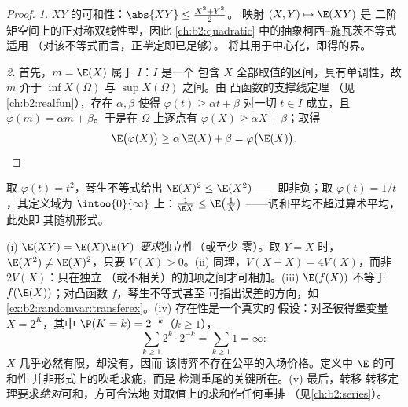 \begin{proof}
\emph{1.} $XY$ 的可和性：$\abs{XY} \leq \frac{X^2 + Y^2}2$。
映射 $(X, Y) \mapsto \E(XY)$ 是
二阶矩空间上的正对称双线性型，因此
\cref{ch:b2:quadratic} 中的抽象柯西--施瓦茨不等式适用
（对该不等式而言，正\emph{半}定即已足够）。
将其用于中心化，即得的界。

\emph{2.} 首先，$m = \E(X)$ 属于 $I$：$I$ 是一个
包含 $X$ 全部取值的区间，具有单调性，故 $m$
介于 $\inf X(\Omega)$ 与 $\sup X(\Omega)$ 之间。由
凸函数的支撑线定理
（见\cref{ch:b2:realfun}），存在 $\alpha, \beta$ 使得
$\varphi(t) \geq \alpha t + \beta$ 对一切 $t \in I$ 成立，且
$\varphi(m) = \alpha m + \beta$。于是在 $\Omega$ 上逐点有
$\varphi(X) \geq \alpha X + \beta$；取得
\[
\E\bigl(\varphi(X)\bigr) \geq \alpha\,\E(X) + \beta
= \varphi\bigl(\E(X)\bigr). \qedhere
\]
\end{proof}

\begin{example}
取 $\varphi(t) = t^2$，琴生不等式给出 $\E(X)^2 \leq \E(X^2)$——
即非负；取 $\varphi(t) = 1/t$，其定义域为
$\intoo{0}{\infty}$ 上：$\frac{1}{\E X} \leq \E\bigl(\frac1X\bigr)$
——调和平均不超过算术平均，此处即
其随机形式。
\end{example}

\begin{remark}[常见陷阱]
(i) $\E(XY) = \E(X)\E(Y)$ \emph{要求}独立性（或至少
零）。取 $Y = X$ 时，$\E(X^2) \neq
\E(X)^2$，只要 $V(X) > 0$。(ii) 同理，$V(X + X) =
4V(X)$，而非 $2V(X)$：只在独立
（或不相关）的加项之间才可相加。(iii) $\E(f(X))$ 不等于
$f(\E(X))$；对凸函数 $f$，琴生不等式甚至
可指出误差的方向，如
\cref{ex:b2:randomvar:transferex}。(iv) 存在性是一个真实的
假设：对圣彼得堡变量 $X = 2^K$，其中
$\P(K = k) = 2^{-k}$（$k \geq 1$），
\[
\sum_{k\geq1}2^k\cdot2^{-k} = \sum_{k\geq1}1 = \infty :
\]
$X$ 几乎必然有限，却没有，因而
该博弈不存在公平的入场价格。定义中 $\E$ 的可和性
并非形式上的吹毛求疵，而是
检测重尾的关键所在。(v) 最后，转移
转移定理要求\emph{绝对}可和，方可合法地
对取值上的求和作任何重排
（见\cref{ch:b2:series}）。
\end{remark}



